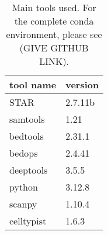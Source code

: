 \begin{table}[htbp]
  \centering
  \begin{tabular}{l|l}
    \toprule
    tool name & version  \\
    \midrule
    STAR & 2.7.11b \\
    samtools & 1.21 \\
    bedtools & 2.31.1 \\
    bedops & 2.4.41 \\
    deeptools & 3.5.5 \\
    python & 3.12.8 \\
    scanpy & 1.10.4 \\
    celltypist & 1.6.3 \\
    \bottomrule
  \end{tabular}
  \caption{Main tools used. For the complete conda environment, please see (GIVE  GITHUB LINK).}
  \label{tab:tools}
\end{table}
